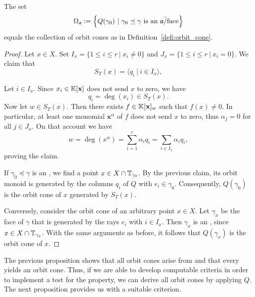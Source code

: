 \begin{prop}
	\label{prop:aface_orbit_cone_correspondence}
	The set
	$$\Omega_\ideal \defeq \left\{Q(\gamma_0)\ |\ \gamma_0\preceq\gamma \text{ is an } \ideal\text{\=/face}\right\}$$
	equals the collection of orbit cones as in Definition~\ref{defi:orbit_cone}.
\end{prop}
\begin{proof}
	Let $x\in X$. Set $I_x = \{1 \leq i \leq r\ |\ x_i \neq 0\}$ and $J_x = \{1 \leq i \leq r\ |\ x_i = 0\}$. We claim that
	$$S_T(x) = \langle q_i\ |\ i\in I_x\rangle,$$
	
	Let $i\in I_x$. Since $x_i\in\mathbb{K}[\mathbf{x}]$ does not send $x$ to zero, we have
	$$q_i = \deg(x_i)\in S_T(x).$$
	Now let $w\in S_T(x)$. Then there exists $f\in\mathbb{K}[\mathbf{x}]_w$ such that $f(x) \neq 0$. In particular, at least one monomial $\mathbf{x}^\alpha$ of $f$ does not send $x$ to zero, thus $\alpha_j = 0$ for all $j\in J_x$. On that account we have
	$$w = \deg(x^\alpha) = \sum_{i=1}^r \alpha_i q_i = \sum_{i\in I_x} \alpha_i q_i,$$
	proving the claim.
	
	If $\gamma_0\preceq\gamma$ is an \aface{}, we find a point $x\in X\cap \mathbb{T}_{\gamma_0}$. By the previous claim, its orbit monoid is generated by the columns $q_i$ of $Q$ with $e_i\in\gamma_0$. Consequently, $Q(\gamma_0)$ is the orbit cone of $x$ generated by $S_T(x)$.
	
	Conversely, consider the orbit cone of an arbitrary point $x\in X$. Let $\gamma_x$ be the face of $\gamma$ that is generated by the rays $e_i$ with $i\in I_x$. Then $\gamma_x$ is an \aface{}, since $x\in X\cap \mathbb{T}_{\gamma_x}$. With the same arguments as before, it follows that $Q(\gamma_x)$ is the orbit cone of $x$.
\end{proof}

The previous proposition shows that all orbit cones arise from \afaces{} and that every \aface{} yields an orbit cone. Thus, if we are able to develop computable criteria in order to implement a test for the \aface{} property, we can derive all orbit cones by applying $Q$. The next proposition provides us with a suitable criterion.

